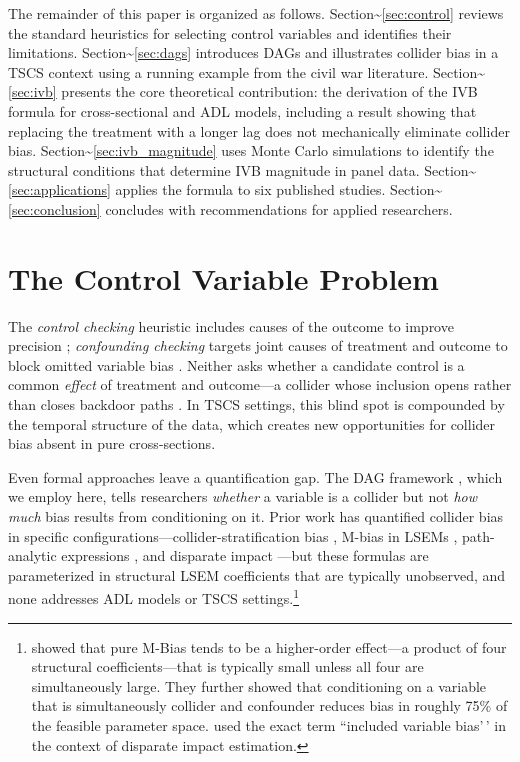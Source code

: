\documentclass[
]{article}
\begin{document}
The remainder of this paper is organized as follows.
Section\textasciitilde{}\ref{sec:control} reviews the standard
heuristics for selecting control variables and identifies their
limitations. Section\textasciitilde{}\ref{sec:dags} introduces DAGs and
illustrates collider bias in a TSCS context using a running example from
the civil war literature. Section\textasciitilde{}\ref{sec:ivb} presents
the core theoretical contribution: the derivation of the IVB formula for
cross-sectional and ADL models, including a result showing that
replacing the treatment with a longer lag does not mechanically
eliminate collider bias. Section\textasciitilde{}\ref{sec:ivb_magnitude}
uses Monte Carlo simulations to identify the structural conditions that
determine IVB magnitude in panel data.
Section\textasciitilde{}\ref{sec:applications} applies the formula to
six published studies. Section\textasciitilde{}\ref{sec:conclusion}
concludes with recommendations for applied researchers.

\section{\texorpdfstring{The Control Variable Problem
\label{sec:control}}{The Control Variable Problem }}\label{the-control-variable-problem}

The \emph{control checking} heuristic includes causes of the outcome to
improve precision \citep[e.g.,][]{dietrich2016donor}; \emph{confounding
checking} targets joint causes of treatment and outcome to block omitted
variable bias \citep[e.g.,][]{hegre2001toward}. Neither asks whether a
candidate control is a common \emph{effect} of treatment and outcome---a
collider whose inclusion opens rather than closes backdoor paths
\citep{cinelli2021crash}. In TSCS settings, this blind spot is
compounded by the temporal structure of the data, which creates new
opportunities for collider bias absent in pure cross-sections.

Even formal approaches leave a quantification gap. The DAG framework
\citep{pearl2009causality}, which we employ here, tells researchers
\emph{whether} a variable is a collider but not \emph{how much} bias
results from conditioning on it. Prior work has quantified collider bias
in specific configurations---collider-stratification bias
\citep{greenland2003quantifying}, M-bias in LSEMs
\citep{ding2015adjust}, path-analytic expressions
\citep{pearl2013linear}, and disparate impact
\citep{jung2024mitigating}---but these formulas are parameterized in
structural LSEM coefficients that are typically unobserved, and none
addresses ADL models or TSCS settings.\footnote{\citet{ding2015adjust}
  showed that pure M-Bias tends to be a higher-order effect---a product
  of four structural coefficients---that is typically small unless all
  four are simultaneously large. They further showed that conditioning
  on a variable that is simultaneously collider and confounder reduces
  bias in roughly 75\% of the feasible parameter space.
  \citet{jung2024mitigating} used the exact term ``included variable
  bias'\,' in the context of disparate impact estimation.}
\end{document}
